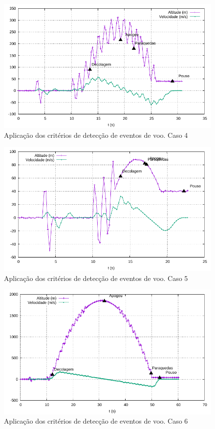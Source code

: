 \documentclass[12pt,a4paper]{article}
\begin{document}
\begin{figure}[!ht]
	\centering
	\includegraphics[width=\textwidth]{./data/cases/case04/trajectory}
	\caption{Aplicação dos critérios de detecção de eventos de voo. Caso 4}
	\label{fig:case04}
\end{figure}
\begin{figure}[!ht]
	\centering
	\includegraphics[width=\textwidth]{./data/cases/case05/trajectory}
	\caption{Aplicação dos critérios de detecção de eventos de voo. Caso 5}
	\label{fig:case05}
\end{figure}
\begin{figure}[!ht]
	\centering
	\includegraphics[width=\textwidth]{./data/cases/case06/trajectory}
	\caption{Aplicação dos critérios de detecção de eventos de voo. Caso 6}
	\label{fig:case06}
\end{figure}
\end{document}

